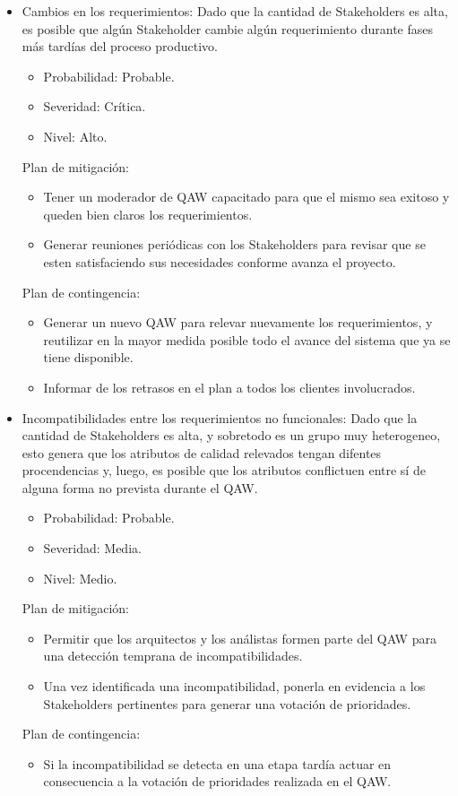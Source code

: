 \begin{itemize}
\bigskip

\item Cambios en los requerimientos: Dado que la cantidad de Stakeholders es alta, es posible que alg\'un Stakeholder cambie alg\'un requerimiento durante fases m\'as tard\'ias del proceso productivo.
\begin{itemize}
\item Probabilidad: Probable.
\item Severidad: Cr\'itica.
\item Nivel: Alto.
\end{itemize}
\medskip
Plan de mitigación:
\begin{itemize}
\item Tener un moderador de QAW capacitado para que el mismo sea exitoso y queden bien claros los requerimientos.
\item Generar reuniones peri\'odicas con los Stakeholders para revisar que se esten satisfaciendo sus necesidades conforme avanza el proyecto.
\end{itemize}
\medskip
Plan de contingencia:
\begin{itemize}
 \item Generar un nuevo QAW para relevar nuevamente los requerimientos, y reutilizar en la mayor medida posible todo el avance del sistema que ya se tiene disponible. 
\item Informar de los retrasos en el plan a todos los clientes involucrados.
\end{itemize}

\bigskip

\item Incompatibilidades entre los requerimientos no funcionales: Dado que la cantidad de Stakeholders es alta, y sobretodo es un grupo muy heterogeneo, esto genera que los atributos de calidad relevados tengan difentes procendencias y, luego, es posible que los atributos conflictuen entre s\'i de alguna forma no prevista durante el QAW.
\begin{itemize}
\item Probabilidad: Probable.
\item Severidad: Media.
\item Nivel: Medio.
\end{itemize}
\medskip
Plan de mitigación:
\begin{itemize}
\item Permitir que los arquitectos y los an\'alistas formen parte del QAW para una detecci\'on temprana de incompatibilidades.
\item Una vez identificada una incompatibilidad, ponerla en evidencia a los Stakeholders pertinentes para generar una votaci\'on de prioridades.
\end{itemize}
\medskip
Plan de contingencia:
\begin{itemize}
\item Si la incompatibilidad se detecta en una etapa tard\'ia actuar en consecuencia a la votaci\'on de prioridades realizada en el QAW.
\end{itemize}


\end{itemize}
